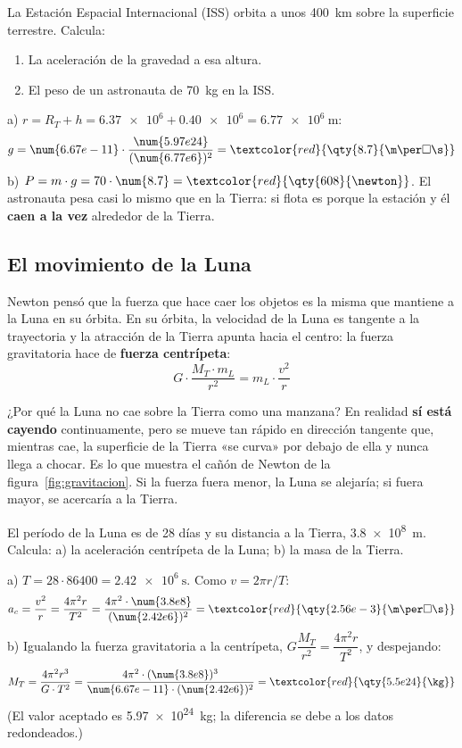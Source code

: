 \begin{exercise}
    La Estación Espacial Internacional (ISS) orbita a unos \qty{400}{\km} sobre la superficie terrestre. Calcula:
    \begin{enumerate}[label=\alph*)]
        \item La aceleración de la gravedad a esa altura.
        \item El peso de un astronauta de \qty{70}{\kg} en la ISS.
    \end{enumerate}
    \begin{solu}
        a) \(r = R_T + h = \num{6.37e6} + \num{0.40e6} = \qty{6.77e6}{\m}\):
        \[ g = \num{6.67e-11} \cdot \frac{\num{5.97e24}}{(\num{6.77e6})^2} = \textcolor{red}{\qty{8.7}{\m\per\square\s}} \]
        b) \(P = m \cdot g = 70 \cdot \num{8.7} = \textcolor{red}{\qty{608}{\newton}}\). El astronauta pesa casi lo mismo que en la Tierra: si flota es porque la estación y él \textbf{caen a la vez} alrededor de la Tierra.
    \end{solu}
\end{exercise}

\subsection{El movimiento de la Luna}

Newton pensó que la fuerza que hace caer los objetos es la misma que mantiene a la Luna en su órbita. En su órbita, la velocidad de la Luna es tangente a la trayectoria y la atracción de la Tierra apunta hacia el centro: la fuerza gravitatoria hace de \textbf{fuerza centrípeta}:
\[ G \cdot \frac{M_T \cdot m_L}{r^2} = m_L \cdot \frac{v^2}{r} \]

¿Por qué la Luna no cae sobre la Tierra como una manzana? En realidad \textbf{sí está cayendo} continuamente, pero se mueve tan rápido en dirección tangente que, mientras cae, la superficie de la Tierra «se curva» por debajo de ella y nunca llega a chocar. Es lo que muestra el cañón de Newton de la figura~\ref{fig:gravitacion}. Si la fuerza fuera menor, la Luna se alejaría; si fuera mayor, se acercaría a la Tierra.

\begin{example}
    El período de la Luna es de 28 días y su distancia a la Tierra, \qty{3.8e8}{\m}. Calcula: a) la aceleración centrípeta de la Luna; b) la masa de la Tierra.

    a) \(T = 28 \cdot 86400 = \qty{2.42e6}{\s}\). Como \(v = 2\pi r / T\):
    \[ a_c = \frac{v^2}{r} = \frac{4\pi^2 r}{T^2} = \frac{4\pi^2 \cdot \num{3.8e8}}{(\num{2.42e6})^2} = \textcolor{red}{\qty{2.56e-3}{\m\per\square\s}} \]
    b) Igualando la fuerza gravitatoria a la centrípeta, \(G \dfrac{M_T}{r^2} = \dfrac{4\pi^2 r}{T^2}\), y despejando:
    \[ M_T = \frac{4\pi^2 r^3}{G \cdot T^2} = \frac{4\pi^2 \cdot (\num{3.8e8})^3}{\num{6.67e-11} \cdot (\num{2.42e6})^2} = \textcolor{red}{\qty{5.5e24}{\kg}} \]
    (El valor aceptado es \qty{5.97e24}{\kg}; la diferencia se debe a los datos redondeados.)
\end{example}

